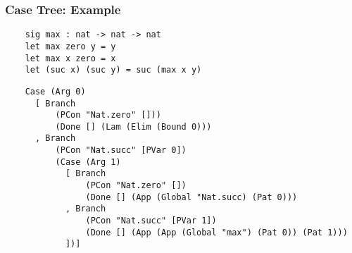 \documentclass[10pt, xelatex, hyperref={pdfpagelabels=false,breaklinks}]{beamer}
\begin{document}
\begin{frame}[fragile]
  \frametitle{Case Tree: Example}

  \begin{verbatim}
    sig max : nat -> nat -> nat
    let max zero y = y
    let max x zero = x
    let (suc x) (suc y) = suc (max x y)
  \end{verbatim}


  \begin{verbatim}
    Case (Arg 0) 
      [ Branch 
          (PCon "Nat.zero" [])) 
          (Done [] (Lam (Elim (Bound 0)))
      , Branch 
          (PCon "Nat.succ" [PVar 0])
          (Case (Arg 1) 
            [ Branch 
                (PCon "Nat.zero" [])
                (Done [] (App (Global "Nat.succ) (Pat 0)))
            , Branch 
                (PCon "Nat.succ" [PVar 1])
                (Done [] (App (App (Global "max") (Pat 0)) (Pat 1)))
            ])]
  \end{verbatim}
\end{frame}
\end{document}
